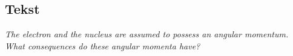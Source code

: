 \subsection{Tekst}

\emph{The electron and the nucleus are assumed to possess an angular momentum. What consequences do these angular momenta have?}